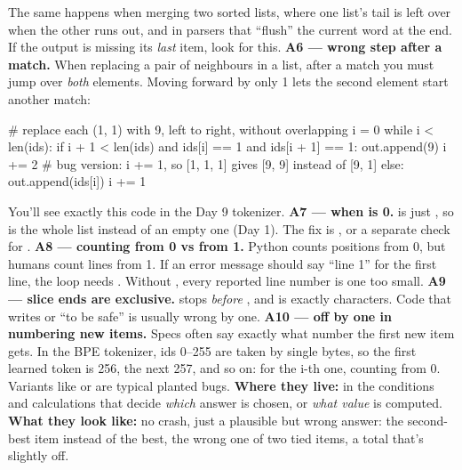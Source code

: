 \documentclass[10pt,a4paper]{article}
\begin{document}
The same happens when merging two sorted lists, where one list’s tail is left over when the other runs out, and in parsers that “flush” the current word at the end. If the output is missing its \emph{last} item, look for this.
\textbf{A6 — wrong step after a match.} When replacing a pair of neighbours  in a list, after a match you must jump over \emph{both} elements. Moving forward by only 1 lets the second element start another match:
\begin{pycode}
# replace each (1, 1) with 9, left to right, without overlapping
i = 0
while i < len(ids):
    if i + 1 < len(ids) and ids[i] == 1 and ids[i + 1] == 1:
        out.append(9)
        i += 2                    # bug version: i += 1, so [1, 1, 1] gives [9, 9] instead of [9, 1]
    else:
        out.append(ids[i])
        i += 1
\end{pycode}
You’ll see exactly this code in the Day 9 tokenizer.
\textbf{A7 —  when  is 0.}  is just , so  is the whole list instead of an empty one (Day 1). The fix is , or a separate check for .
\textbf{A8 — counting from 0 vs from 1.} Python counts positions from 0, but humans count lines from 1. If an error message should say “line 1” for the first line, the loop needs . Without , every reported line number is one too small.
\textbf{A9 — slice ends are exclusive.}  stops \emph{before} , and  is exactly  characters. Code that writes  or  “to be safe” is usually wrong by one.
\textbf{A10 — off by one in numbering new items.} Specs often say exactly what number the first new item gets. In the BPE tokenizer, ids 0–255 are taken by single bytes, so the first learned token is 256, the next 257, and so on:  for the i-th one, counting from 0. Variants like  or  are typical planted bugs.
\textbf{Where they live:} in the conditions and calculations that decide \emph{which} answer is chosen, or \emph{what value} is computed.
\textbf{What they look like:} no crash, just a plausible but wrong answer: the second-best item instead of the best, the wrong one of two tied items, a total that’s slightly off.
\end{document}

